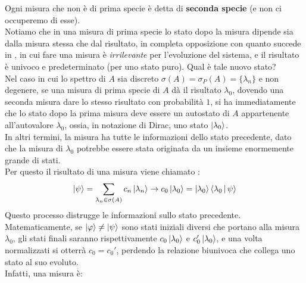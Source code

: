\documentclass[../../FisicaTeorica.tex]{subfiles}
\begin{document}
Ogni misura che non è di prima specie è detta di \textbf{seconda specie} (e non ci occuperemo di esse).\\
Notiamo che in una misura di prima specie lo stato dopo la misura dipende sia dalla misura stessa che dal risultato, in completa opposizione con quanto succede in \MC, in cui fare una misura è \textit{irrilevante} per l'evoluzione del sistema, e il risultato è univoco e predeterminato (per uno stato puro). Qual è tale nuovo stato?\\
Nel caso in cui lo spettro di $A$ sia discreto $\sigma(A)=\sigma_P(A) = \{\lambda_n\}$ e non degenere, se una misura di prima specie di $A$ dà il risultato $\lambda_0$, dovendo una seconda misura dare lo stesso risultato con probabilità $1$, si ha immediatamente che lo stato dopo la prima misura deve essere un autostato di $A$ appartenente all'autovalore $\lambda_0$, ossia, in notazione di Dirac, uno stato $\Ket{\lambda_0}$.\\
In altri termini, la misura ha  tutte le informazioni dello stato precedente, dato che la misura di $\lambda_0$ potrebbe essere stata originata da un insieme enormemente grande di stati.\\
Per questo il risultato di una misura viene chiamato : 
\[
\Ket{\psi} = \sum_{\lambda_n\in \sigma(A)}c_n\Ket{\lambda_n}\to c_0 \Ket{\lambda_0} = \Ket{\lambda_0}\Braket{\lambda_0 | \psi}
\] 
Questo processo distrugge le informazioni sullo stato precedente. Matematicamente, se $\Ket{\varphi} \neq \Ket{\psi}$ sono stati iniziali diversi che portano alla misura $\lambda_0$, gli stati finali saranno rispettivamente $c_0 \Ket{\lambda_0}$ e $c_0' \Ket{\lambda_0}$, e una volta normalizzati si otterrà $c_0 = c_0'$, perdendo la relazione biunivoca che collega uno stato al suo evoluto.\\
Infatti, una misura è:
\end{document}
